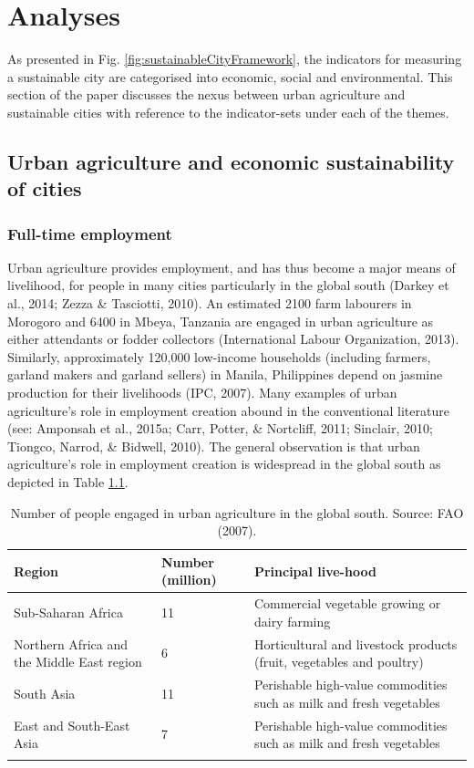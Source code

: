 \chapter{Analyses} %

\label{Chapter:Analyses}

As presented in Fig. \ref{fig:sustainableCityFramework}, the indicators for measuring a sustainable city are categorised into economic, social and environmental. This section of the paper discusses the nexus between urban agriculture and sustainable cities with reference to the indicator-sets under each of the themes.

\section{Urban agriculture and economic sustainability of cities}

\subsection{Full-time employment}

Urban agriculture provides employment, and has thus become a major means of livelihood, for people in many cities particularly in the global south (Darkey et al., 2014; Zezza \& Tasciotti, 2010). An estimated 2100 farm labourers in Morogoro and 6400 in Mbeya, Tanzania are engaged in urban agriculture as either attendants or fodder collectors (International Labour Organization, 2013). Similarly, approximately 120,000 low-income households (including farmers, garland makers and garland sellers) in Manila, Philippines depend on jasmine production for their livelihoods (IPC, 2007). Many examples of urban agriculture's role in employment creation abound in the conventional literature (see: Amponsah et al., 2015a; Carr, Potter, \& Nortcliff, 2011; Sinclair, 2010; Tiongco, Narrod, \& Bidwell, 2010). The general observation is that urban agriculture's role in employment creation is widespread in the global south as depicted in Table \ref{tbl:peopleEngagedInUA}.

\begin{table}[th]
\caption{Number of people engaged in urban agriculture in the global south. Source: FAO (2007).}
\begin{center}
\begin{tabular}{ p{} p{} p{} } 
\hline
Region & Number (million) & Principal live-hood \\
\hline
Sub-Saharan Africa & 11 & Commercial vegetable growing or dairy farming \\
Northern Africa and the Middle East region & 6 & Horticultural and livestock products (fruit, vegetables and poultry) \\
South Asia & 11 & Perishable high-value commodities such as milk and fresh vegetables \\
East and South-East Asia & 7 & Perishable high-value commodities such as milk and fresh vegetables \\
\hline
\label{tbl:peopleEngagedInUA}
\end{tabular}
\end{center}
\end{table}

